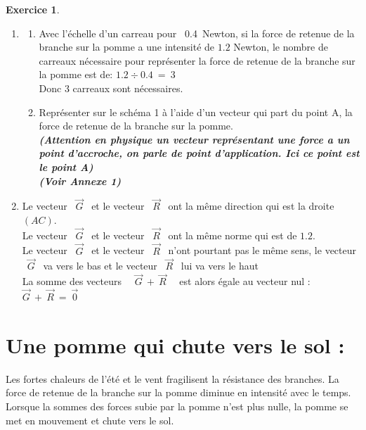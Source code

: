 \documentclass[a4paper,10.9pt]{article}
\theoremstyle{definition}
\newtheorem{exo}{Exercice}
\begin{document}
\begin{exo}
\begin{enumerate}
	\item
	 \begin{enumerate}
		\item Avec l'échelle d'un carreau pour ~0.4~Newton, si la force de retenue de la branche sur la pomme a une intensité de $1.2$ Newton, le nombre de carreaux nécessaire pour représenter la force de retenue de la branche sur la pomme est de: \quad $1.2 \div 0.4 \ = \ 3$\\
		Donc $3$ carreaux sont nécessaires.
		\item Représenter sur le schéma 1 à l'aide d'un vecteur qui part du point A, la force de retenue de la branche sur la pomme.
		\\ \textit{\textbf{(Attention en physique un vecteur représentant une force a un point d'accroche, on parle de point d'application. Ici ce point est le point A)}}\\ \textbf{\textit{(Voir Annexe 1)}}
	\end{enumerate}
	\item  Le vecteur ~$\vec{G}$~ et le vecteur ~$\vec{R}$~ ont la même direction qui est la droite $\left(AC\right)$.\\
	 Le vecteur ~$\vec{G}$~ et le vecteur ~$\vec{R}$~ ont la même norme qui est de $1.2$.\\
	  Le vecteur ~$\vec{G}$~ et le vecteur ~$\vec{R}$~ n'ont pourtant pas le même sens, le vecteur ~$\vec{G}$~ va vers le bas et le vecteur ~$\vec{R}$~ lui va vers le haut\\
	  La somme des vecteurs ~~$\vec{G} \ + \ \vec{R}$~~ est alors égale au vecteur nul : \quad~~$\vec{G} \ + \ \vec{R} \ = \ \vec{0}$~~   
\end{enumerate}
\section*{Une pomme qui chute vers le sol :}
\noindent Les fortes chaleurs de l'été et le vent fragilisent la résistance des branches. La force de retenue de la branche sur la pomme diminue en intensité avec le temps. Lorsque la sommes des forces subie par la pomme n'est plus nulle, la pomme se met en mouvement et chute vers le sol.\\


\end{exo}
\end{document}
